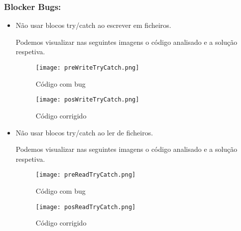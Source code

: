 \subsubsection{Blocker Bugs:}
\begin{itemize}
\item Não usar blocos try/catch ao escrever em ficheiros.\newline


\par Podemos visualizar nas seguintes imagens o código analisado e a solução respetiva.

\begin{figure}[H]

  \centering

  \texttt{[image: preWriteTryCatch.png]}

  \caption {Código com bug}

  \label {fig02}

\end{figure}

\begin{figure}[H]

  \centering

  \texttt{[image: posWriteTryCatch.png]}

  \caption {Código corrigido}

  \label {fig03}

\end{figure}

\item Não usar blocos try/catch ao ler de ficheiros.\newline


\par Podemos visualizar nas seguintes imagens o código analisado e a solução respetiva.


\begin{figure}[H]

  \centering

  \texttt{[image: preReadTryCatch.png]}

  \caption {Código com bug}

  \label {fig04}

\end{figure}

\begin{figure}[H]

  \centering

  \texttt{[image: posReadTryCatch.png]}

  \caption {Código corrigido}

  \label {fig05}

\end{figure}

\end{itemize}

